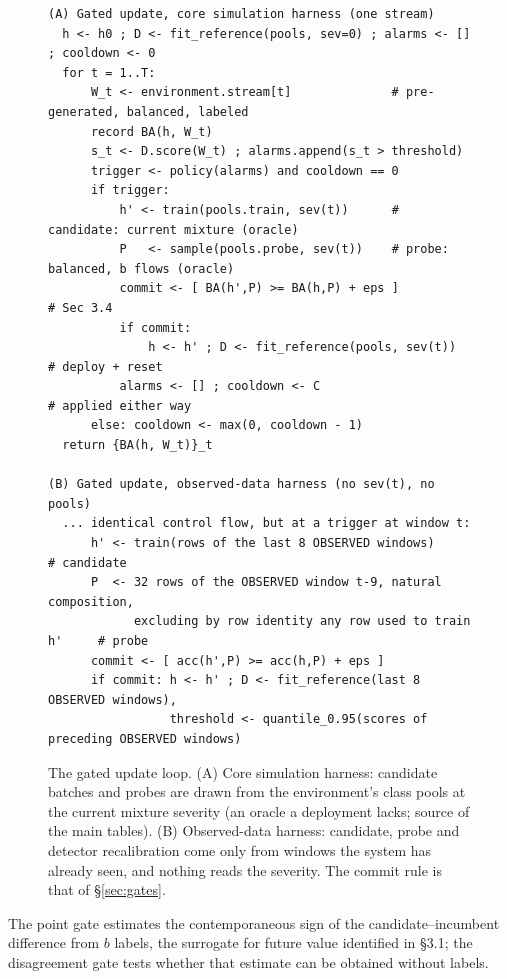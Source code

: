 \documentclass[a4paper,fleqn]{cas-sc}
\begin{document}
\begin{figure}[t]
\small
\begin{verbatim}
(A) Gated update, core simulation harness (one stream)
  h <- h0 ; D <- fit_reference(pools, sev=0) ; alarms <- [] ; cooldown <- 0
  for t = 1..T:
      W_t <- environment.stream[t]              # pre-generated, balanced, labeled
      record BA(h, W_t)
      s_t <- D.score(W_t) ; alarms.append(s_t > threshold)
      trigger <- policy(alarms) and cooldown == 0
      if trigger:
          h' <- train(pools.train, sev(t))      # candidate: current mixture (oracle)
          P   <- sample(pools.probe, sev(t))    # probe: balanced, b flows (oracle)
          commit <- [ BA(h',P) >= BA(h,P) + eps ]                  # Sec 3.4
          if commit:
              h <- h' ; D <- fit_reference(pools, sev(t))          # deploy + reset
          alarms <- [] ; cooldown <- C                             # applied either way
      else: cooldown <- max(0, cooldown - 1)
  return {BA(h, W_t)}_t

(B) Gated update, observed-data harness (no sev(t), no pools)
  ... identical control flow, but at a trigger at window t:
      h' <- train(rows of the last 8 OBSERVED windows)             # candidate
      P  <- 32 rows of the OBSERVED window t-9, natural composition,
            excluding by row identity any row used to train h'     # probe
      commit <- [ acc(h',P) >= acc(h,P) + eps ]
      if commit: h <- h' ; D <- fit_reference(last 8 OBSERVED windows),
                 threshold <- quantile_0.95(scores of preceding OBSERVED windows)
\end{verbatim}
\caption{The gated update loop. (A) Core simulation harness: candidate batches and probes are drawn from the environment's class pools at the current mixture severity (an oracle a deployment lacks; source of the main tables). (B) Observed-data harness: candidate, probe and detector recalibration come only from windows the system has already seen, and nothing reads the severity. The commit rule is that of \S\ref{sec:gates}.}
\label{fig:algorithm}
\end{figure}


The point gate estimates the contemporaneous sign of the candidate--incumbent difference from $b$ labels, the surrogate for future value identified in \S3.1; the disagreement gate tests whether that estimate can be obtained without labels.
\end{document}
